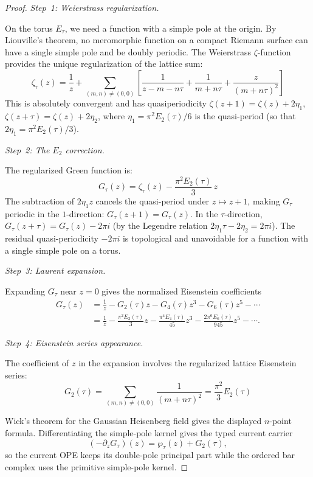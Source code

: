 \begin{proof}

\emph{Step~1: Weierstrass regularization.}

On the torus $E_\tau$, we need a function with a simple pole at the origin. By Liouville's theorem, no meromorphic function on a compact Riemann surface can have a single simple pole and be doubly periodic. The Weierstrass $\zeta$-function provides the unique regularization of the lattice sum:
\[\zeta_\tau(z) = \frac{1}{z} + \sum_{(m,n) \neq (0,0)} \left[\frac{1}{z - m - n\tau} + \frac{1}{m+n\tau} + \frac{z}{(m+n\tau)^2}\right]\]
This is absolutely convergent and has quasiperiodicity $\zeta(z+1) = \zeta(z) + 2\eta_1$, $\zeta(z+\tau) = \zeta(z) + 2\eta_2$, where $\eta_1 = \pi^2 E_2(\tau)/6$ is the quasi-period (so that $2\eta_1 = \pi^2 E_2(\tau)/3$).

\emph{Step~2: The $E_2$ correction.}

The regularized Green function is:
\[G_\tau(z) = \zeta_\tau(z) - \frac{\pi^2 E_2(\tau)}{3}\, z\]
The subtraction of $2\eta_1 z$ cancels the quasi-period under $z \mapsto z + 1$, making $G_\tau$ periodic in the $1$-direction: $G_\tau(z+1) = G_\tau(z)$. In the $\tau$-direction, $G_\tau(z+\tau) = G_\tau(z) - 2\pi i$ (by the Legendre relation $2\eta_1\tau - 2\eta_2 = 2\pi i$). The residual quasi-periodicity $-2\pi i$ is topological and unavoidable for a function with a single simple pole on a torus.

\emph{Step~3: Laurent expansion.}

Expanding $G_\tau$ near $z=0$ gives the normalized Eisenstein
coefficients
\begin{align}
G_\tau(z)
&= \frac{1}{z} - G_2(\tau)z - G_4(\tau)z^3
-G_6(\tau)z^5-\cdots  \\
&= \frac{1}{z} - \frac{\pi^2 E_2(\tau)}{3} z
-\frac{\pi^4 E_4(\tau)}{45}z^3
-\frac{2\pi^6 E_6(\tau)}{945}z^5-\cdots .
\end{align}

\emph{Step~4: Eisenstein series appearance.}

The coefficient of $z$ in the expansion involves the regularized
lattice Eisenstein series:
\[G_2(\tau) = \sum_{(m,n) \neq (0,0)} \frac{1}{(m+n\tau)^2} = \frac{\pi^2}{3} E_2(\tau)\]

Wick's theorem for the Gaussian Heisenberg field gives the displayed
$n$-point formula. Differentiating the simple-pole kernel gives the
typed current carrier
\[
(-\partial_zG_\tau)(z)=\wp_\tau(z)+G_2(\tau),
\]
so the current OPE keeps its double-pole principal part while the
ordered bar complex uses the primitive simple-pole kernel.
\end{proof}

